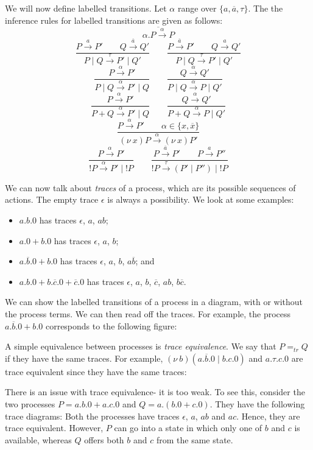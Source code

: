 \documentclass[a4paper, openany]{memoir}
\theoremstyle{definition}
\begin{document}
    We will now define labelled transitions. Let $\alpha$ range over $\{a, \overline{a}, \tau\}$. The the inference rules for labelled transitions are given as follows:
    \[\overline{\alpha.P \xrightarrow{\alpha} P}\]
    \[\frac{P \xrightarrow{a} P' \qquad Q \xrightarrow{\overline{a}} Q'}{P \mid Q \xrightarrow{\tau} P' \mid Q'} \qquad \frac{P \xrightarrow{\overline{a}} P' \qquad Q \xrightarrow{a} Q'}{P \mid Q \xrightarrow{\tau} P' \mid Q'}\]
    \[\frac{P \xrightarrow{\alpha} P'}{P \mid Q \xrightarrow{\alpha} P' \mid Q} \qquad \frac{Q \xrightarrow{\alpha} Q'}{P \mid Q \xrightarrow{\alpha} P \mid Q'}\]
    \[\frac{P \xrightarrow{\alpha} P'}{P + Q \xrightarrow{\alpha} P' \mid Q} \qquad \frac{Q \xrightarrow{\alpha} Q'}{P + Q \xrightarrow{\alpha} P \mid Q'}\]
    \[\frac{P \xrightarrow{\alpha} P' \qquad \alpha \in \{x, \overline{x}\}}{(\nu \ x)P \xrightarrow{\alpha} (\nu \ x)P'}\]
    \[\frac{P \xrightarrow{\alpha} P'}{!P \xrightarrow{\alpha} P' \mid !P} \qquad \frac{P \xrightarrow{\overline{a}} P' \qquad P \xrightarrow{a} P''}{!P \xrightarrow{\tau} (P' \mid P'') \mid !P}\]

    We can now talk about \emph{traces} of a process, which are its possible sequences of actions. The empty trace $\epsilon$ is always a possibility. We look at some examples:
    \begin{itemize}
        \item $a.b.0$ has traces $\epsilon$, $a$, $ab$;
        \item $a.0 + b.0$ has traces $\epsilon$, $a$, $b$;
        \item $a.\overline{b}.0 + b.0$ has traces $\epsilon$, $a$, $b$, $a\overline{b}$; and
        \item $a.b.0 + b.\overline{c}.0 + \overline{c}.0$ has traces $\epsilon$, $a$, $b$, $\overline{c}$, $ab$, $b\overline{c}$.
    \end{itemize}

    We can show the labelled transitions of a process in a diagram, with or without the process terms. We can then read off the traces. For example, the process $a.\overline{b}.0 + b.0$ corresponds to the following figure:

    A simple equivalence between processes is \emph{trace equivalence}. We say that $P =_{tr} Q$ if they have the same traces. For example, $(\nu \ b)(a.\overline{b}.0 \mid b.c.0)$ and $a.\tau.c.0$ are trace equivalent since they have the same traces:

    There is an issue with trace equivalence- it is too weak. To see this, consider the two processes $P = a.b.0 + a.c.0$ and $Q = a.(b.0 + c.0)$. They have the following trace diagrams:
    Both the processes have traces $\epsilon$, $a$, $ab$ and $ac$. Hence, they are trace equivalent. However, $P$ can go into a state in which only one of $b$ and $c$ is available, whereas $Q$ offers both $b$ and $c$ from the same state. 
\end{document}
